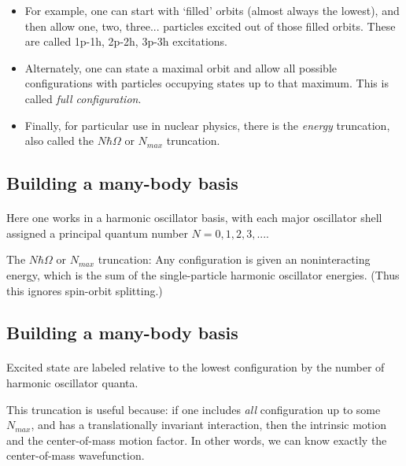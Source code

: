 \documentclass[%
twoside,                 %
final,                   %
10pt]{article}
\begin{document}
\begin{itemize}
\item For example, one can start with `filled' orbits (almost always the lowest), and then  allow one, two, three... particles excited out of those filled orbits. These are called  1p-1h, 2p-2h, 3p-3h excitations. 

\item Alternately, one can state a maximal orbit and allow all possible configurations with  particles occupying states up to that maximum. This is called \emph{full configuration}.

\item Finally, for particular use in nuclear physics, there is the \emph{energy} truncation, also  called the $N\hbar\Omega$ or $N_{max}$ truncation. 
\end{itemize}

\noindent



\subsection*{Building a many-body basis}

\paragraph{}
 Here one works in a harmonic oscillator basis, with each major oscillator shell assigned 
a principal quantum number $N=0,1,2,3,...$. 

The $N\hbar\Omega$ or $N_{max}$ truncation: Any configuration is given an noninteracting energy, which is the sum 
of the single-particle harmonic oscillator energies. (Thus this ignores 
spin-orbit splitting.)




\subsection*{Building a many-body basis}

\paragraph{}
Excited state are labeled relative to the lowest configuration by the 
number of harmonic oscillator quanta.

This truncation is useful because: if one includes \emph{all} configuration up to 
some $N_{max}$, and has a translationally invariant interaction, then the intrinsic 
motion and the center-of-mass motion factor. In other words, we can know exactly 
the center-of-mass wavefunction.
\end{document}
